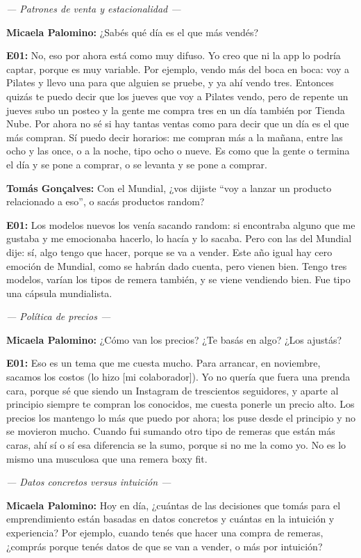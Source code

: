 \noindent\textit{--- Patrones de venta y estacionalidad ---}

\noindent\textbf{Micaela Palomino:} ¿Sabés qué día es el que más vendés?

\noindent\textbf{E01:} No, eso por ahora está como muy difuso. Yo creo que ni la app lo podría captar, porque es muy variable. Por ejemplo, vendo más del boca en boca: voy a Pilates y llevo una para que alguien se pruebe, y ya ahí vendo tres. Entonces quizás te puedo decir que los jueves que voy a Pilates vendo, pero de repente un jueves subo un posteo y la gente me compra tres en un día también por Tienda Nube. Por ahora no sé si hay tantas ventas como para decir que un día es el que más compran. Sí puedo decir horarios: me compran más a la mañana, entre las ocho y las once, o a la noche, tipo ocho o nueve. Es como que la gente o termina el día y se pone a comprar, o se levanta y se pone a comprar.

\noindent\textbf{Tomás Gonçalves:} Con el Mundial, ¿vos dijiste ``voy a lanzar un producto relacionado a eso'', o sacás productos random?

\noindent\textbf{E01:} Los modelos nuevos los venía sacando random: si encontraba alguno que me gustaba y me emocionaba hacerlo, lo hacía y lo sacaba. Pero con las del Mundial dije: sí, algo tengo que hacer, porque se va a vender. Este año igual hay cero emoción de Mundial, como se habrán dado cuenta, pero vienen bien. Tengo tres modelos, varían los tipos de remera también, y se viene vendiendo bien. Fue tipo una cápsula mundialista.

\noindent\textit{--- Política de precios ---}

\noindent\textbf{Micaela Palomino:} ¿Cómo van los precios? ¿Te basás en algo? ¿Los ajustás?

\noindent\textbf{E01:} Eso es un tema que me cuesta mucho. Para arrancar, en noviembre, sacamos los costos (lo hizo [mi colaborador]). Yo no quería que fuera una prenda cara, porque sé que siendo un Instagram de trescientos seguidores, y aparte al principio siempre te compran los conocidos, me cuesta ponerle un precio alto. Los precios los mantengo lo más que puedo por ahora; los puse desde el principio y no se movieron mucho. Cuando fui sumando otro tipo de remeras que están más caras, ahí sí o sí esa diferencia se la sumo, porque si no me la como yo. No es lo mismo una musculosa que una remera boxy fit.

\noindent\textit{--- Datos concretos versus intuición ---}

\noindent\textbf{Micaela Palomino:} Hoy en día, ¿cuántas de las decisiones que tomás para el emprendimiento están basadas en datos concretos y cuántas en la intuición y experiencia? Por ejemplo, cuando tenés que hacer una compra de remeras, ¿comprás porque tenés datos de que se van a vender, o más por intuición?

